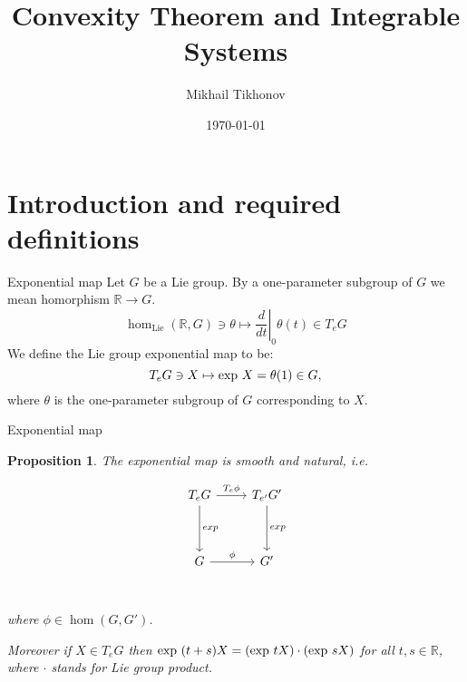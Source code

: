 \documentclass{beamer}
\title{Convexity Theorem and Integrable Systems}
\date{\today}
\author{Mikhail Tikhonov}
\institute{University of Virginia}
\newtheorem{proposition}{Proposition}[theorem]
\def\exp{{\rm exp}}
\def\R{\mathbb{R}}
\begin{document}
  \maketitle
  \section{Introduction and required definitions}
  \begin{frame}{Exponential map}
    Let $G$ be a Lie group. By a one-parameter subgroup of $G$ we mean homorphism $\mathbb{R} \to G$.
    \[
        \hom_{\text{Lie}} (\mathbb{R}, G)   \ni   \theta \mapsto \left.  \frac{d}{dt} \right|_0 \theta(t) \in T_e G 
    \]
    We define the Lie group exponential map to be:
    \[
        T_e G \ni X \mapsto \exp\ X = \theta (1) \in G,  
    \]
    where $\theta$ is the one-parameter subgroup of $G$ corresponding to $X$.
  \end{frame}
  \begin{frame}{Exponential map}
    \begin{proposition}
        

        The exponential map is smooth and natural, i.e.

        \[
            \begin{tikzcd}[ampersand replacement=\&, column sep=small]
                {T_e G} \&  \&{T_{e'} G'} \\
                \\ 
                G \& \&  G' \\
                \arrow["exp",from=1-1, to=3-1]
                \arrow["T_e \phi", from=1-1, to=1-3]
                \arrow["exp",from=1-3, to=3-3]
                \arrow["\phi", from=3-1, to=3-3]
            \end{tikzcd}
        \]
        where $\phi \in \hom (G, G')$.

        Moreover if $X \in T_e G$ then $\exp\  (t+s) X = (\exp\  tX) \cdot (\exp\  sX)$ for all $t,s \in \R$, where $\cdot$ stands for Lie group product.
    \end{proposition}
            
\end{frame}
\end{document}
